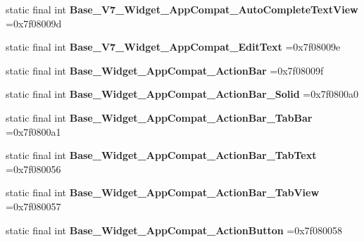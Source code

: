 \begin{DoxyCompactItemize}
\item 
\hypertarget{classcheck_1_1test_1_1_r_1_1style_a6201a1dd682ebabb0375ad9d2155a42e}{}static final int {\bfseries Base\+\_\+\+V7\+\_\+\+Widget\+\_\+\+App\+Compat\+\_\+\+Auto\+Complete\+Text\+View} =0x7f08009d\label{classcheck_1_1test_1_1_r_1_1style_a6201a1dd682ebabb0375ad9d2155a42e}

\item 
\hypertarget{classcheck_1_1test_1_1_r_1_1style_a03a00b964abc29c91ea1ee22dfcef6e6}{}static final int {\bfseries Base\+\_\+\+V7\+\_\+\+Widget\+\_\+\+App\+Compat\+\_\+\+Edit\+Text} =0x7f08009e\label{classcheck_1_1test_1_1_r_1_1style_a03a00b964abc29c91ea1ee22dfcef6e6}

\item 
\hypertarget{classcheck_1_1test_1_1_r_1_1style_a0f2d166a443e6ced6d3444786fe3b64d}{}static final int {\bfseries Base\+\_\+\+Widget\+\_\+\+App\+Compat\+\_\+\+Action\+Bar} =0x7f08009f\label{classcheck_1_1test_1_1_r_1_1style_a0f2d166a443e6ced6d3444786fe3b64d}

\item 
\hypertarget{classcheck_1_1test_1_1_r_1_1style_a32bfb9dffa3b22d72b219d1a0de8d09f}{}static final int {\bfseries Base\+\_\+\+Widget\+\_\+\+App\+Compat\+\_\+\+Action\+Bar\+\_\+\+Solid} =0x7f0800a0\label{classcheck_1_1test_1_1_r_1_1style_a32bfb9dffa3b22d72b219d1a0de8d09f}

\item 
\hypertarget{classcheck_1_1test_1_1_r_1_1style_a29d44d442d8f2177959857ecf05225a1}{}static final int {\bfseries Base\+\_\+\+Widget\+\_\+\+App\+Compat\+\_\+\+Action\+Bar\+\_\+\+Tab\+Bar} =0x7f0800a1\label{classcheck_1_1test_1_1_r_1_1style_a29d44d442d8f2177959857ecf05225a1}

\item 
\hypertarget{classcheck_1_1test_1_1_r_1_1style_a3599b0fa4b3e79db52e822a1a3d9d2d2}{}static final int {\bfseries Base\+\_\+\+Widget\+\_\+\+App\+Compat\+\_\+\+Action\+Bar\+\_\+\+Tab\+Text} =0x7f080056\label{classcheck_1_1test_1_1_r_1_1style_a3599b0fa4b3e79db52e822a1a3d9d2d2}

\item 
\hypertarget{classcheck_1_1test_1_1_r_1_1style_a94272ce68982cb9423b6948377a4b245}{}static final int {\bfseries Base\+\_\+\+Widget\+\_\+\+App\+Compat\+\_\+\+Action\+Bar\+\_\+\+Tab\+View} =0x7f080057\label{classcheck_1_1test_1_1_r_1_1style_a94272ce68982cb9423b6948377a4b245}

\item 
\hypertarget{classcheck_1_1test_1_1_r_1_1style_a680d519c9b23dc681b711bd984ec5d8a}{}static final int {\bfseries Base\+\_\+\+Widget\+\_\+\+App\+Compat\+\_\+\+Action\+Button} =0x7f080058\label{classcheck_1_1test_1_1_r_1_1style_a680d519c9b23dc681b711bd984ec5d8a}


\end{DoxyCompactItemize}

